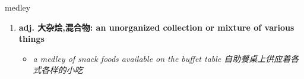 
\begin{frame}
{\huge medley}
\begin{center}
\begin{enumerate}\Large
  \item \textbf{adj. 大杂烩,混合物: an unorganized collection or mixture of various things}
  \begin{itemize}
    \item \em{\Large{a medley of snack foods available on the buffet table 自助餐桌上供应着各式各样的小吃}}
  \end{itemize}
\end{enumerate}
\end{center}
\end{frame}
